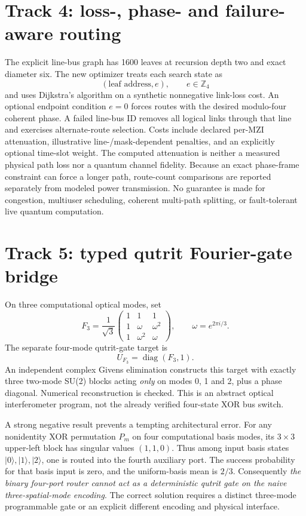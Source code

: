 \documentclass[10pt]{article}
\begin{document}
\section{Track 4: loss-, phase- and failure-aware routing}
The explicit line-bus graph has 1600 leaves at recursion
depth two and exact diameter six. The new optimizer
treats each search state as
\[
(\text{leaf address}, e),\qquad e\in\mathbb{Z}_4
\]
and uses Dijkstra's algorithm on a synthetic
nonnegative link-loss cost. An optional endpoint
condition $e=0$ forces routes with the desired
modulo-four coherent phase. A failed line-bus ID
removes all logical links through that line
and exercises alternate-route selection.
Costs include declared per-MZI attenuation,
illustrative line-/mask-dependent penalties,
and an explicitly optional time-slot weight.
The computed attenuation is neither a measured
physical path loss nor a quantum channel fidelity.
Because an exact phase-frame constraint can force
a longer path, route-count comparisons are reported
separately from modeled power transmission.
No guarantee is made for congestion, multiuser
scheduling, coherent multi-path splitting, or
fault-tolerant live quantum computation.

\section{Track 5: typed qutrit Fourier-gate bridge}
On three computational optical modes, set
\[
F_3=\frac1{\sqrt3}
\begin{pmatrix}
1&1&1\\1&\omega&\omega^2\\
1&\omega^2&\omega
\end{pmatrix},\qquad
\omega=e^{2\pi i/3}.
\]
The separate four-mode qutrit-gate target is
\[
U_{F_3}=\operatorname{diag}(F_3,1).
\]
An independent complex Givens elimination
constructs this target with exactly three
two-mode SU(2) blocks acting \emph{only} on
modes 0, 1 and 2, plus a phase diagonal.
Numerical reconstruction is checked.
This is an abstract optical interferometer
program, not the already verified four-state
XOR bus switch.

A strong negative result prevents a tempting
architectural error. For any nonidentity XOR
permutation $P_m$ on four computational basis
modes, its $3\times3$ upper-left block has
singular values $(1,1,0)$. Thus among input
basis states $|0\rangle,|1\rangle,|2\rangle$,
one is routed into the fourth auxiliary port.
The success probability for that basis input
is zero, and the uniform-basis mean is $2/3$.
Consequently \emph{the binary four-port router
cannot act as a deterministic qutrit gate
on the naive three-spatial-mode encoding}.
The correct solution requires a distinct
three-mode programmable gate or an explicit
different encoding and physical interface.
\end{document}
